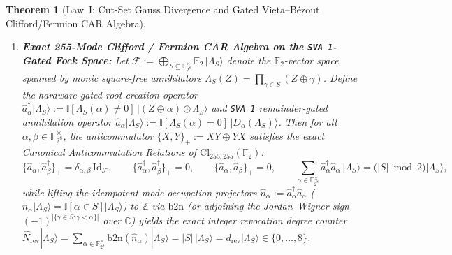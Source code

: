 \documentclass[11pt,letterpaper]{article}
\theoremstyle{spectralthm}
\newtheorem{theorem}{Theorem}[section]
\begin{document}
\begin{theorem}[Law~I: Cut-Set Gauss Divergence and Gated Vieta--B\'{e}zout Clifford/Fermion CAR Algebra]
\begin{enumerate}
\begin{equation}
\label{eq:law1_toeplitz_cuntz}
D_\alpha \circ M_\alpha = \mathrm{Id}_{\mathbb{F}_{2^8}[Z]}, \qquad [D_\alpha, M_\alpha](P) := (D_\alpha M_\alpha \oplus M_\alpha D_\alpha)(P) = P(\alpha)\cdot 1_{\mathbb{F}_{2^8}[Z]}, \qquad [D_\alpha, D_\beta] = [M_\alpha, M_\beta] = 0.
\end{equation}
\item \textbf{Exact 255-Mode Clifford / Fermion CAR Algebra on the \texttt{SVA~1\textquotesingle}-Gated Fock Space:} Let $\mathcal{F} := \bigoplus_{S \subseteq \mathbb{F}_{2^8}^\times} \mathbb{F}_2\,|\Lambda_S\rangle$ denote the $\mathbb{F}_2$-vector space spanned by monic square-free annihilators $\Lambda_S(Z) = \prod_{\gamma \in S} (Z \oplus \gamma)$. Define the hardware-gated root creation operator $\hat{a}_\alpha^\dagger |\Lambda_S\rangle := \mathbb{I}[\Lambda_S(\alpha) \neq 0]\,|(Z \oplus \alpha)\odot \Lambda_S\rangle$ and \texttt{SVA~1\textquotesingle} remainder-gated annihilation operator $\hat{a}_\alpha |\Lambda_S\rangle := \mathbb{I}[\Lambda_S(\alpha) = 0]\,|D_\alpha(\Lambda_S)\rangle$. Then for all $\alpha, \beta \in \mathbb{F}_{2^8}^\times$, the anticommutator $\{X, Y\}_+ := X Y \oplus Y X$ satisfies the exact Canonical Anticommutation Relations of $\mathrm{Cl}_{255,255}(\mathbb{F}_2)$:
\begin{equation}
\label{eq:law1_clifford_car}
\bigl\{\hat{a}_\alpha, \hat{a}_\beta^\dagger\bigr\}_+ = \delta_{\alpha,\beta}\,\mathrm{Id}_{\mathcal{F}}, \qquad \bigl\{\hat{a}_\alpha^\dagger, \hat{a}_\beta^\dagger\bigr\}_+ = 0, \qquad \bigl\{\hat{a}_\alpha, \hat{a}_\beta\bigr\}_+ = 0, \qquad \sum_{\alpha \in \mathbb{F}_{2^8}^\times} \hat{a}_\alpha^\dagger \hat{a}_\alpha \,|\Lambda_S\rangle = \bigl(|S| \bmod 2\bigr)|\Lambda_S\rangle,
\end{equation}
while lifting the idempotent mode-occupation projectors $\hat{n}_\alpha := \hat{a}_\alpha^\dagger \hat{a}_\alpha$ ($\hat{n}_\alpha|\Lambda_S\rangle = \mathbb{I}[\alpha \in S]|\Lambda_S\rangle$) to $\mathbb{Z}$ via $\mathrm{b2n}$ (or adjoining the Jordan--Wigner sign $(-1)^{|\{\gamma \in S : \gamma < \alpha\}|}$ over $\mathbb{C}$) yields the exact integer revocation degree counter $\hat{N}_{\mathrm{rev}}|\Lambda_S\rangle = \sum_{\alpha \in \mathbb{F}_{2^8}^\times} \mathrm{b2n}(\hat{n}_\alpha)|\Lambda_S\rangle = |S|\,|\Lambda_S\rangle = d_{\mathrm{rev}}|\Lambda_S\rangle \in \{0,\dots,8\}$.
\end{enumerate}
\end{theorem}
\end{document}
